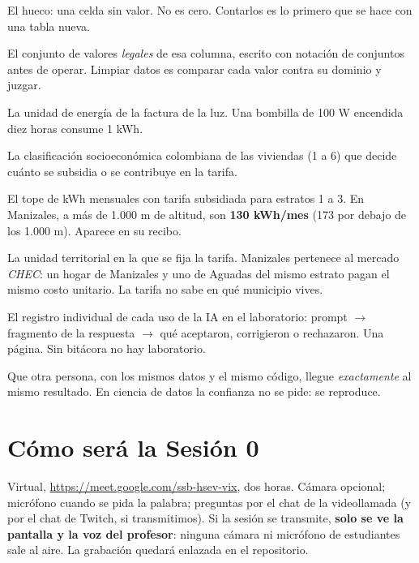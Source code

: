 \documentclass[12pt,letterpaper]{article}
\newcommand{\ENLACEMEET}{\url{https://meet.google.com/ssb-hsev-vix}}
\begin{document}
\begin{description}[leftmargin=1.5em,style=nextline]
    \item[NaN (\emph{not a number})] El hueco: una celda sin valor. No es cero. Contarlos es lo primero que se hace con una tabla nueva.
    \item[Dominio de una columna] El conjunto de valores \emph{legales} de esa columna, escrito con notación de conjuntos antes de operar. Limpiar datos es comparar cada valor contra su dominio y juzgar.
    \item[kWh (kilovatio-hora)] La unidad de energía de la factura de la luz. Una bombilla de 100 W encendida diez horas consume 1 kWh.
    \item[Estrato] La clasificación socioeconómica colombiana de las viviendas (1 a 6) que decide cuánto se subsidia o se contribuye en la tarifa.
    \item[Consumo de subsistencia (CS)] El tope de kWh mensuales con tarifa subsidiada para estratos 1 a 3. En Manizales, a más de 1.000 m de altitud, son \textbf{130 kWh/mes} (173 por debajo de los 1.000 m). Aparece en su recibo.
    \item[Mercado de comercialización] La unidad territorial en la que se fija la tarifa. Manizales pertenece al mercado \emph{CHEC}: un hogar de Manizales y uno de Aguadas del mismo estrato pagan el mismo costo unitario. La tarifa no sabe en qué municipio vives.
    \item[Bitácora de IA] El registro individual de cada uso de la IA en el laboratorio: prompt $\to$ fragmento de la respuesta $\to$ qué aceptaron, corrigieron o rechazaron. Una página. Sin bitácora no hay laboratorio.
    \item[Reproducibilidad] Que otra persona, con los mismos datos y el mismo código, llegue \emph{exactamente} al mismo resultado. En ciencia de datos la confianza no se pide: se reproduce.
\end{description}

\section{Cómo será la Sesión 0}
Virtual, \ENLACEMEET, dos horas. Cámara opcional; micrófono cuando se pida la palabra; preguntas por el chat de la videollamada (y por el chat de Twitch, si transmitimos). Si la sesión se transmite, \textbf{solo se ve la pantalla y la voz del profesor}: ninguna cámara ni micrófono de estudiantes sale al aire. La grabación quedará enlazada en el repositorio.
\end{document}
